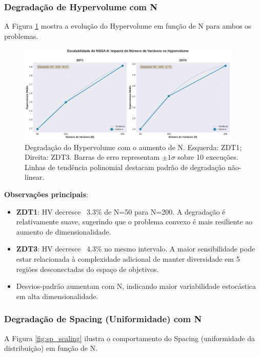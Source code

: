 \subsubsection{Degradação de Hypervolume com N}
A Figura \ref{fig:hv_scaling} mostra a evolução do Hypervolume em função de N para ambos os problemas.

\begin{figure}[h]
\centering
\includegraphics[width=0.95\textwidth]{../plots/I_hypervolume_nvar_scaling.pdf}
\caption{Degradação do Hypervolume com o aumento de N. Esquerda: ZDT1; Direita: ZDT3. Barras de erro representam $\pm 1\sigma$ sobre 10 execuções. Linhas de tendência polinomial destacam padrão de degradação não-linear.}
\label{fig:hv_scaling}
\end{figure}

\textbf{Observações principais}:
\begin{itemize}
  \item \textbf{ZDT1}: HV decresce ~3.3\% de N=50 para N=200. A degradação é relativamente suave, sugerindo que o problema convexo é mais resiliente ao aumento de dimensionalidade.
  \item \textbf{ZDT3}: HV decresce ~4.3\% no mesmo intervalo. A maior sensibilidade pode estar relacionada à complexidade adicional de manter diversidade em 5 regiões desconectadas do espaço de objetivos.
  \item Desvios-padrão aumentam com N, indicando maior variabilidade estocástica em alta dimensionalidade.
\end{itemize}

\subsubsection{Degradação de Spacing (Uniformidade) com N}
A Figura \ref{fig:sp_scaling} ilustra o comportamento do Spacing (uniformidade da distribuição) em função de N.

